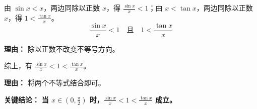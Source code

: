 \begin{examplebox}
\begin{description}[style=nextline, leftmargin=2.8em, labelsep=0.5em, itemsep=0.45em]
    \item[\textbf{第三步（转化回分式）：}] 由 $\sin x < x$，两边同除以正数 $x$，得 $\frac{\sin x}{x} < 1$；由 $x < \tan x$，两边同除以正数 $x$，得 $1 < \frac{\tan x}{x}$。
    \[
    \frac{\sin x}{x} < 1 \quad \text{且} \quad 1 < \frac{\tan x}{x}
    \]
    \par\textbf{理由：}
    除以正数不改变不等号方向。

    \item[\textbf{第四步（合并结论）：}] 综上，有 $\frac{\sin x}{x} < 1 < \frac{\tan x}{x}$。
    \par\textbf{理由：}
    将两个不等式结合即可。
\end{description}

\textbf{\textcolor{CExample}{关键结论：}} \textbf{当 $x \in (0, \frac{\pi}{2})$ 时，$\frac{\sin x}{x} < 1 < \frac{\tan x}{x}$ 成立。}
\end{examplebox}
